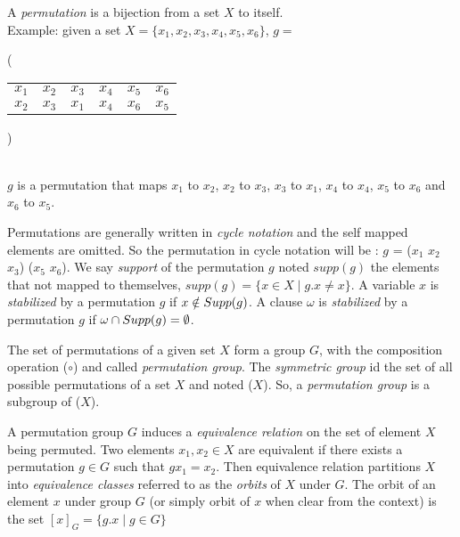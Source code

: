 A \emph{permutation} is a bijection from a set $X$ to itself.\\
 Example: given a set $X = \{x_1, x_2, x_3, x_4, x_5, x_6\}$,
$g = ${\Bigg( \begin{tabular}{cccccc}
		$x_1$ & $x_2$ & $x_3$ & $x_4$ & $x_5$ & $x_6$\\
		$x_2$ & $x_3$ & $x_1$ & $x_4$ & $x_6$ & $x_5$
	\end{tabular} \Bigg)}\\
$g$ is a permutation that maps $x_1$ to $x_2$, $x_2$ to $x_3$, $x_3$ to $x_1$, $x_4$ to $x_4$, $x_5$ to $x_6$ and $x_6$ to $x_5$.

Permutations are generally written in \emph{cycle notation} and the self mapped elements are omitted.
So the permutation in cycle notation will be : $g$ = ($x_1$ $x_2$ $x_3$) ($x_5$ $x_6$).
We say \emph{support} of the permutation $g$ noted $supp(g)$ the elements that not mapped to themselves,
$supp(g) = \{ x \in X \mid g.x \neq x\}$. A variable $x$ is \emph{stabilized} by a permutation $g$ 
if $x \notin Supp(g)$. A clause $\omega$ is \emph{stabilized} by a permutation $g$ if 
$\omega \cap Supp(g) = \emptyset$. 


The set of permutations of a given set $X$ form a group $G$,
with the composition operation ($\circ$) and called \emph{permutation group}.
The \emph{symmetric group} id the set of all possible permutations of a set $X$ and noted \Group($X$).
So, a \emph{permutation group} is a subgroup of \Group($X$). 


A permutation group $G$ induces a \emph{equivalence relation} on the set of element $X$ being
permuted. Two elements $x_1, x_2 \in X$ are equivalent if there exists a permutation $g \in G$ such that
$g x_1 = x_2$. Then equivalence relation partitions $X$ into \emph{equivalence classes} referred to
as the \emph{orbits} of $X$ under $G$. The orbit of an element $x$ under group $G$ (or simply orbit of $x$ when clear
from the context) is the set $[x]_G = \{g.x \mid g \in G\}$




